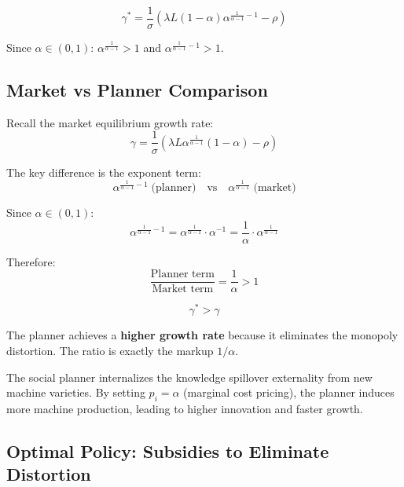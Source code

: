 \begin{resultbox}
\[
\boxed{\gamma^* = \frac{1}{\sigma} \left( \lambda L (1-\alpha) \alpha^{\frac{1}{\alpha-1}-1} - \rho \right)}
\tag{Romer Planner Growth}
\]

Since $\alpha \in (0,1)$: $\alpha^{\frac{1}{\alpha-1}} > 1$ and $\alpha^{\frac{1}{\alpha-1}-1} > 1$.
\end{resultbox}

\subsection{Market vs Planner Comparison}

\begin{derivationbox}
Recall the market equilibrium growth rate:
\[
\gamma = \frac{1}{\sigma} \left( \lambda L \alpha^{\frac{1}{\alpha-1}} (1-\alpha) - \rho \right)
\tag{Market Growth}
\]

The key difference is the exponent term:
\[
\alpha^{\frac{1}{\alpha-1}-1} \; \text{(planner)} \quad \text{vs} \quad
\alpha^{\frac{1}{\alpha-1}} \; \text{(market)}
\]

Since $\alpha \in (0,1)$:
\[
\alpha^{\frac{1}{\alpha-1}-1} = \alpha^{\frac{1}{\alpha-1}} \cdot \alpha^{-1}
= \frac{1}{\alpha} \cdot \alpha^{\frac{1}{\alpha-1}}
\]

Therefore:
\[
\frac{\text{Planner term}}{\text{Market term}} = \frac{1}{\alpha} > 1
\]
\end{derivationbox}

\begin{resultbox}
\[
\boxed{\gamma^* > \gamma}
\]

The planner achieves a \textbf{higher growth rate} because it eliminates
the monopoly distortion. The ratio is exactly the markup $1/\alpha$.
\end{resultbox}

\begin{tcolorbox}[colback=blue!10,colframe=blue3,title=Intuition]
The social planner internalizes the knowledge spillover externality from new
machine varieties. By setting $p_i = \alpha$ (marginal cost pricing), the
planner induces more machine production, leading to higher innovation
and faster growth.
\end{tcolorbox}

\subsection{Optimal Policy: Subsidies to Eliminate Distortion}

